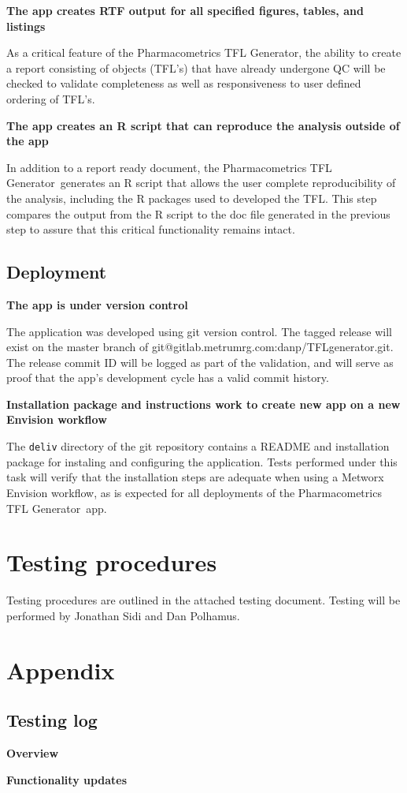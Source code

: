 \documentclass{article}
\newcommand{\tfl}{Pharmacometrics TFL Generator}
\newcommand{\testinglog}{cr_testinglog.pdf}
\begin{document}
{\bf The app creates RTF output for all specified figures, tables, and listings}

As a critical feature of the \tfl, the ability to create a report consisting of objects (TFL's) that have already undergone QC will be checked to validate completeness as well as responsiveness to user defined ordering of TFL's.

{\bf The app creates an R script that can reproduce the analysis outside of the app}

In addition to a report ready document, the \tfl\ generates an R script that allows the user complete reproducibility of the analysis, including the R packages used to developed the TFL.  This step compares the output from the R script to the doc file generated in the previous step to assure that this critical functionality remains intact.


\subsection*{Deployment}

{\bf The app is under version control}

The application was developed using git version control.  The tagged release will exist on the master branch of git@gitlab.metrumrg.com:danp/TFLgenerator.git.  The release commit ID will be logged as part of the validation, and will serve as proof that the app's development cycle has a valid commit history.

{\bf Installation package and instructions work to create new app on a new Envision workflow}

The \verb=deliv= directory of the git repository contains a README and installation package for instaling and configuring the application. Tests performed under this task will verify that the installation steps are adequate when using a Metworx Envision workflow, as is expected for all deployments of the \tfl\ app.


\section*{Testing procedures}

Testing procedures are outlined in the attached testing document.  Testing will be performed by Jonathan Sidi and Dan Polhamus.

\newpage
\section*{Appendix}

\subsection*{Testing log}

{\bf Overview}


{\bf Functionality updates}

\end{document}
